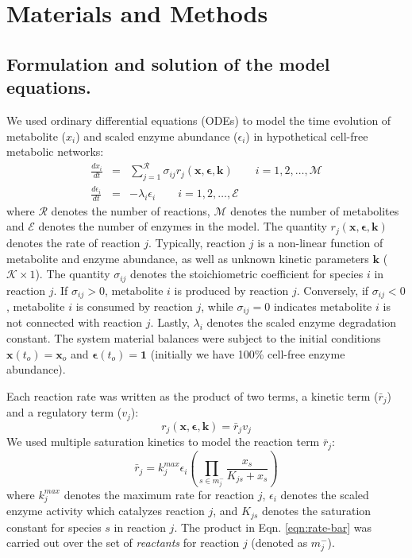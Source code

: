 \documentclass[processes,article,accept,moreauthors,pdftex,12pt,a4paper]{mdpi}
\begin{document}
\section{Materials and Methods}\vspace{-12pt}

\subsection{Formulation and solution of the model equations.}

We used ordinary differential equations (ODEs) to model the time evolution of metabolite ($x_{i}$) and scaled enzyme abundance ($\epsilon_{i}$) in hypothetical cell-free metabolic networks:
\begin{eqnarray}
	\frac{dx_{i}}{dt} & = & \sum_{j = 1}^{\mathcal{R}}\sigma_{ij}r_{j}\left(\mathbf{x},\mathbf{\epsilon},\mathbf{k}\right)\qquad{i=1,2,\hdots,\mathcal{M}}\\
	\frac{d\epsilon_{i}}{dt} & = & -\lambda_{i}\epsilon_{i}\qquad{i = 1,2,\hdots,\mathcal{E}}
\end{eqnarray}where $\mathcal{R}$ denotes the number of reactions, $\mathcal{M}$ denotes the number of metabolites and $\mathcal{E}$ denotes the number of enzymes in the model. 
The quantity $r_{j}\left(\mathbf{x},\mathbf{\epsilon},\mathbf{k}\right)$ denotes the rate of reaction $j$. 
Typically, reaction $j$ is a non-linear function of metabolite and enzyme abundance, as well as unknown kinetic parameters $\mathbf{k}$ ($\mathcal{K}\times{1}$). 
The quantity $\sigma_{ij}$ denotes the stoichiometric coefficient for species $i$ in reaction $j$. 
If $\sigma_{ij}>0$, metabolite $i$ is produced by reaction $j$. 
Conversely, if $\sigma_{ij}<0$, metabolite $i$ is consumed by reaction $j$, while $\sigma_{ij} = 0$ indicates metabolite $i$ is not connected with reaction $j$. 
Lastly, $\lambda_{i}$ denotes the scaled enzyme degradation constant. 
The system material balances were subject to the initial conditions $\mathbf{x}\left(t_{o}\right) = \mathbf{x}_{o}$ and $\mathbf{\epsilon}\left(t_{o}\right) = \mathbf{1}$ (initially we have 100\% cell-free enzyme abundance). 

Each reaction rate was written as the product of two terms, a kinetic term ($\bar{r}_{j}$) and a regulatory term ($v_{j}$):
\begin{equation}\label{eqn:rate-factor}
	r_{j}\left(\mathbf{x},\mathbf{\epsilon},\mathbf{k}\right) = \bar{r}_{j}v_{j}
\end{equation}
We used multiple saturation kinetics to model the reaction term $\bar{r}_{j}$:
\begin{equation}\label{eqn:rate-bar}
	\bar{r}_{j} = k_{j}^{max}\epsilon_{i}\left(\prod_{s\in{m_{j}^{-}}}\frac{x_{s}}{K_{js} + x_{s}}\right)
\end{equation}
where $k_{j}^{max}$ denotes the maximum rate for reaction $j$, $\epsilon_{i}$ denotes the scaled enzyme activity which catalyzes reaction $j$, and
$K_{js}$ denotes the saturation constant for species $s$ in reaction $j$. 
The product in Eqn. \eqref{eqn:rate-bar} was carried out over the set of \textit{reactants} for reaction $j$ (denoted as $m_{j}^{-}$). 
\end{document}
